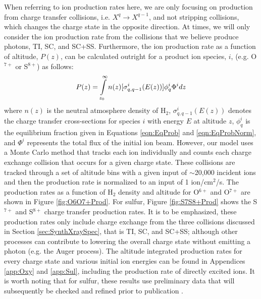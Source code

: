 \documentclass[draft]{agujournal2018}
\begin{document}
When referring to ion production rates here, we are only focusing on production from charge transfer collisions, i.e. $X^q \rightarrow X^{q-1}$, and not stripping collisions, which changes the charge state in the opposite direction.
At times, we will only consider the ion production rate from the collisions that we believe produce photons, TI, SC, and SC+SS.
Furthermore, the ion production rate as a function of altitude, $P(z)$, can be calculated outright for a product ion species, $i$, (e.g. O$^{7+}$ or S$^{8+}$) as follows:
\begin{equation}
    P(z)=\int\displaylimits_{z_0}^{\infty}n(z)[\sigma_{q,q-1}^i(E(z))]\phi_q^i\Phi^idz
\end{equation}
where $n(z)$ is the neutral atmosphere density of H$_2$, $\sigma_{q,q-1}^i(E(z))$ denotes the charge transfer cross-sections for species $i$ with energy $E$ at altitude $z$, $\phi_q^i$ is the equilibrium fraction given in Equations \ref{eqn:EqProb} and \ref{eqn:EqProbNorm}, and $\Phi^i$ represents the total flux of the initial ion beam.
However, our model uses a Monte Carlo method that tracks each ion individually and counts each charge exchange collision that occurs for a given charge state.
These collisions are tracked through a set of altitude bins with a given input of $\sim$20,000 incident ions and then the production rate is normalized to an input of 1 ion/cm$^2$/s.
The production rates as a function of H$_2$ density and altitude for O$^{6+}$ and O$^{7+}$ are shown in Figure \ref{fig:O6O7+Prod}.
For sulfur, Figure \ref{fig:S7S8+Prod} shows the S$^{7+}$ and S$^{8+}$ charge transfer production rates.
It is to be emphasized, these production rates only include charge exchange from the three collisions discussed in Section \ref{sec:SynthXraySpec}, that is TI, SC, and SC+SS; although other processes can contribute to lowering the overall charge state without emitting a photon (e.g. the Auger process).
The altitude integrated production rates for every charge state and various initial ion energies can be found in Appendices \ref{app:Oxy} and \ref{app:Sul}, including the production rate of directly excited ions.
It is worth noting that for sulfur, these results use preliminary data that will subsequently be checked and refined prior to publication \citep{gharibnejad2019}.
\end{document}
